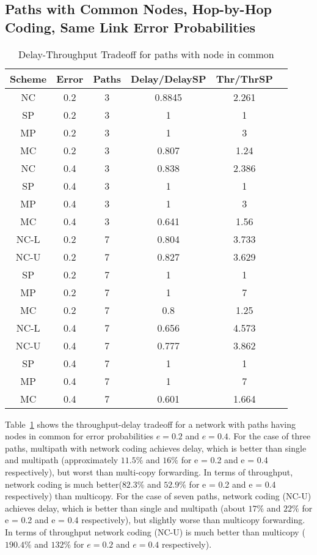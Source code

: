 \documentclass[journal, onecolumn, 12pt]{IEEEtran}
\begin{document}
\subsection{Paths with Common Nodes, Hop-by-Hop Coding, Same Link Error Probabilities}
\label{sec:numerical_hopbyhop}

\begin{table}[ht]
\centering
\begin{tabular}{c c c c c c}
\hline\hline
Scheme & Error & Paths & Delay/DelaySP & Thr/ThrSP\\ [0.5ex]
\hline
NC & 0.2 & 3 & 0.8845 & 2.261  \\
SP & 0.2 & 3 & 1 & 1  \\
MP & 0.2 & 3 & 1 & 3 \\
MC & 0.2 & 3 & 0.807 & 1.24 \\ [1ex]


NC & 0.4 & 3 & 0.838 & 2.386  \\
SP & 0.4 & 3 & 1 & 1  \\
MP & 0.4 & 3 & 1 & 3 \\
MC & 0.4 & 3 & 0.641 & 1.56 \\ [1ex]



NC-L & 0.2 & 7 & 0.804 & 3.733  \\
NC-U & 0.2 & 7 & 0.827 & 3.629  \\
SP & 0.2 & 7 & 1 &  1  \\
MP & 0.2 & 7 & 1 & 7 \\
MC & 0.2 & 7 & 0.8 & 1.25 \\ [1ex]


NC-L & 0.4 & 7 & 0.656 & 4.573  \\
NC-U & 0.4 & 7 & 0.777 & 3.862  \\
SP & 0.4 & 7 & 1 &  1  \\
MP & 0.4 & 7 & 1 & 7 \\
MC & 0.4 & 7 & 0.601 & 1.664 \\ [1ex]
\hline
\end{tabular}
\caption{Delay-Throughput Tradeoff for paths with node in common}
\label{table:trcommon}
\end{table}

Table~\ref{table:trcommon} shows the throughput-delay tradeoff for a network with paths having nodes in common for error probabilities $e=0.2$ and $e=0.4$.
For the case of three paths, multipath with network coding achieves delay, which is better than single and multipath (approximately $11.5\%$ and $16\%$ for e = 0.2 and e = 0.4 respectively),
but worst than multi-copy forwarding.
In terms of throughput, network coding is much better($82.3\%$ and $52.9\%$ for e = 0.2 and e = 0.4 respectively) than multicopy.
For the case of seven paths, network coding (NC-U) achieves delay, which is better than single and multipath (about $17\%$ and $22\%$ for e = 0.2 and e = 0.4 respectively), but slightly worse than multicopy forwarding.
In terms of throughput network coding (NC-U) is much better than multicopy ($190.4\%$ and $132\%$ for $e=0.2$ and $e=0.4$ respectively).
\end{document}
